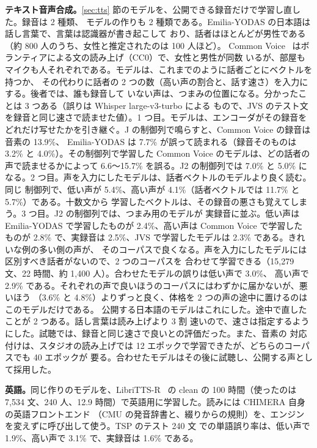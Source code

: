 \documentclass[10pt,a4paper,twocolumn]{article}
\begin{document}
\textbf{テキスト音声合成。}\ref{sec:tts} 節のモデルを、公開できる録音だけで学習し直した。録音は 2 種類、
モデルの作りも 2 種類である。Emilia-YODAS の日本語は話し言葉で、言葉は認識器が書き起こして
おり、話者はほとんどが男性である（約 800 人のうち、女性と推定されたのは 100 人ほど）。
Common Voice~\cite{commonvoice} はボランティアによる文の読み上げ（CC0）で、女性と男性が同数
いるが、部屋もマイクも人それぞれである。モデルは、これまでのように話者ごとにベクトルを持つか、
その代わりに話者の 2 つの数（高い声の割合と、話す速さ）を入力にする。後者では、誰も録音して
いない声は、つまみの位置になる。分かったことは 3 つある（誤りは Whisper large-v3-turbo による
もので、JVS のテスト文を録音と同じ速さで読ませた値）。1 つ目。モデルは、エンコーダがその録音を
どれだけ写せたかを引き継ぐ。J の制御列で鳴らすと、Common Voice の録音は音素の 13.9\%、
Emilia-YODAS は 7.7\% が誤って読まれる（録音そのものは 3.2\% と 4.0\%）。その制御列で学習した
Common Voice のモデルは、どの話者の声で読ませるかによって 6.6〜15.7\% を誤る。J2 の制御列では
7.0\% と 5.0\% になる。2 つ目。声を入力にしたモデルは、話者ベクトルのモデルより良く読む。同じ
制御列で、低い声が 5.4\%、高い声が 4.1\%（話者ベクトルでは 11.7\% と 5.7\%）である。十数文から
学習したベクトルは、その録音の悪さも覚えてしまう。3 つ目。J2 の制御列では、つまみ用のモデルが
実録音に並ぶ。低い声は Emilia-YODAS で学習したものが 2.4\%、高い声は Common Voice で学習した
ものが 2.8\% で、実録音は 2.5\%、JVS で学習したモデルは 2.3\% である。きれいな例の多い側の声が、
そのコーパスで良くなる。声を入力にしたモデルには区別すべき話者がないので、2 つのコーパスを
合わせて学習できる（15,279 文、22 時間、約 1,400 人）。合わせたモデルの誤りは低い声で 3.0\%、
高い声で 2.9\% である。それぞれの声で良いほうのコーパスにはわずかに届かないが、悪いほう
（3.6\% と 4.8\%）よりずっと良く、体格を 2 つの声の途中に置けるのはこのモデルだけである。
公開する日本語のモデルはこれにした。途中で直したことが 2 つある。話し言葉は読み上げより 3 割
速いので、速さは指定するようにした。試聴では、録音と同じ速さで良いとの評価だった。また、音素の
対応付けは、スタジオの読み上げでは 12 エポックで学習できたが、どちらのコーパスでも 40 エポックが
要る。合わせたモデルはその後に試聴し、公開する声として採用した。

\textbf{英語。}同じ作りのモデルを、LibriTTS-R~\cite{librittsr} の clean の 100 時間（使ったのは
7,534 文、240 人、12.9 時間）で英語用に学習した。読みには CHIMERA 自身の英語フロントエンド
（CMU の発音辞書と、綴りからの規則）を、エンジンを変えずに呼び出して使う。TSP のテスト 240 文
での単語誤り率は、低い声で 1.9\%、高い声で 3.1\% で、実録音は 1.6\% である。
\end{document}
